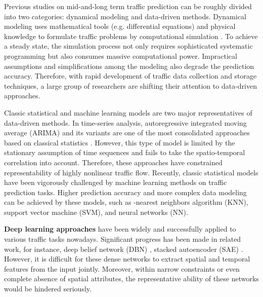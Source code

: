 \documentclass{article}
\begin{document}
Previous studies on mid-and-long term traffic prediction can be roughly divided into two categories: dynamical modeling and data-driven methods. Dynamical modeling uses mathematical tools (e.g. differential equations) and physical knowledge to formulate traffic problems by computational simulation \cite{vlahogianni2015computational}. To achieve a steady state, the simulation process not only requires sophisticated systematic programming but also consumes massive computational power. Impractical assumptions and simplifications among the modeling also degrade the prediction accuracy. Therefore, with rapid development of traffic data collection and storage techniques, a large group of researchers are shifting their attention to data-driven approaches.

Classic statistical and machine learning models are two major representatives of data-driven methods. In time-series analysis, autoregressive integrated moving average (ARIMA) and its variants are one of the most consolidated approaches based on classical statistics \cite{ahmed1979analysis,williams2003modeling}. However, this type of model is limited by the stationary assumption of time sequences and fails to take the spatio-temporal correlation into account. Therefore, these approaches have constrained representability of highly nonlinear traffic flow. Recently, classic statistical models have been vigorously challenged by machine learning methods on traffic prediction tasks. Higher prediction accuracy and more complex data modeling can be achieved by these models, such as -nearest neighbors algorithm (KNN), support vector machine (SVM), and neural networks (NN).

\textbf{Deep learning approaches} have been widely and successfully applied to various traffic tasks nowadays. Significant progress has been made in related work, for instance, deep belief network (DBN) \cite{jia2016traffic,huang2014deep}, stacked autoencoder (SAE) \cite{lv2015traffic,chen2016learning}. However, it is difficult for these dense networks to extract spatial and temporal features from the input jointly. Moreover, within narrow constraints or even complete absence of spatial attributes, the representative ability of these networks would be hindered seriously.
\end{document}
